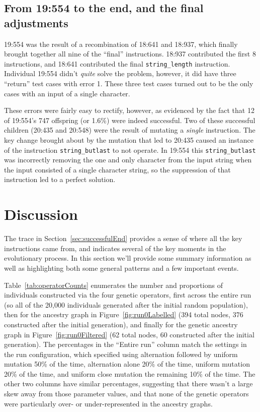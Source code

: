 \documentclass[graybox]{svmult}
\begin{document}
\subsection{From 19:554 to the end, and the final adjustments}

19:554 was the result of a recombination of 18:641 and 18:937, which finally
brought together all nine of the ``final'' instructions. 18:937 contributed
the first 8 instructions, and 18:641 contributed the final 
\texttt{string\_length} instruction. Individual 19:554 didn't \emph{quite} solve the
problem, however, it did have three ``return'' test cases with error 1. These three test cases turned out to be the only cases with an input of a single character.

These errors were fairly easy to rectify, however, as evidenced by the 
fact that 12 of 19:554's 747 offspring (or 1.6\%) were indeed successful.
Two of these successful children (20:435 and 20:548) were the result of 
mutating a \emph{single} instruction. The key change brought about by the 
mutation that led to 20:435 
caused an instance of the instruction \texttt{string\_butlast} to not operate. 
In 19:554 this \texttt{string\_butlast} was incorrectly removing the one and 
only character
from the input string when the input consisted of a single character string, so 
the suppression of that instruction led to a perfect solution.

\section{Discussion}
\label{sec:discussion}

The trace in Section~\ref{sec:successfulEnd} provides a sense of where all
the key instructions came from, and indicates several of the key moments in the
evolutionary process. In this section we'll provide some summary information
as well as highlighting both some general patterns and a few important events.

Table~\ref{tab:operatorCounts} enumerates the number and proportions 
of individuals constructed via the four genetic operators, first across the
entire run (so all of the 20,000 individuals generated after the initial
random population), then for the ancestry graph in 
Figure~\ref{fig:run0Labelled} (394 total nodes, 
376 constructed after the initial generation), and finally for the genetic 
ancestry
graph in Figure~\ref{fig:run0Filtered} (62 total nodes, 60 constructed after 
the initial generation). The percentages in the ``Entire run'' column match
the settings in the run configuration, which specified using alternation 
followed by uniform mutation 50\% of the time, alternation alone 20\% of the 
time, uniform mutation 20\% of the time, and uniform close mutation the 
remaining 10\% of the time. 
The other two columns have similar percentages,
suggesting that there wasn't a large skew away from those parameter values,
and that none of the genetic operators were particularly over- or 
under-represented in the ancestry graphs.
\end{document}
